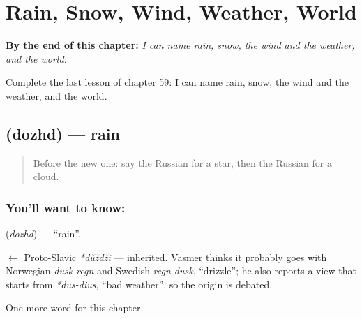 
\chapter{Rain, Snow, Wind, Weather, World}
\label{ch:ru-rain-snow-wind-weather-world}

\begin{chapteropening}
\textbf{By the end of this chapter:} \emph{I can name rain, snow, the wind and the weather, and the world.}

Complete the last lesson of chapter 59: I can name rain, snow, the wind and the weather, and the world.
\end{chapteropening}

\section[\texorpdfstring{\ru{дождь} (dozhd)}{дождь (dozhd)}]{ (dozhd) — rain}

\label{lesson:RU-C59-rain}



\begin{quote}
Before the new one: say the Russian for a star, then the Russian for a cloud.
\end{quote}

\subsection*{You'll want to know: }
\textbf{} (\emph{dozhd}) — \textquotedblleft{}rain\textquotedblright{}.

\begin{cousinweb}
\textbf{} $\leftarrow$ Proto-Slavic \emph{*dŭždžĭ} — inherited. Vasmer thinks it probably goes with Norwegian \emph{dusk-regn} and Swedish \emph{regn-dusk}, \textquotedblleft{}drizzle\textquotedblright{}; he also reports a view that starts from \emph{*dus-dius}, \textquotedblleft{}bad weather\textquotedblright{}, so the origin is debated.
\end{cousinweb}

\begin{grammarlens}[title={What you've built}]
One more word for this chapter.
\end{grammarlens}

